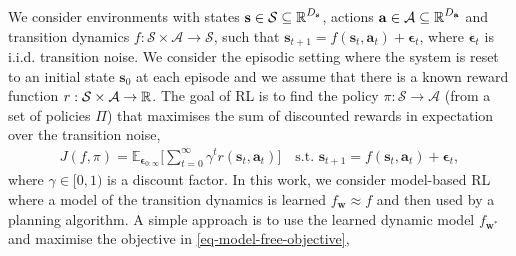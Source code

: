 \documentclass{article}
\newcommand{\state}{\ensuremath{\mathbf{s}}}
\newcommand{\action}{\ensuremath{\mathbf{a}}}
\newcommand{\noise}{\ensuremath{\bm\epsilon}}
\newcommand{\discount}{\ensuremath{\gamma}}
\newcommand{\stateDomain}{\ensuremath{\mathcal{S}}}
\newcommand{\actionDomain}{\ensuremath{\mathcal{A}}}
\newcommand{\policyDomain}{\ensuremath{\Pi}}
\newcommand{\rewardFn}{\ensuremath{r}}
\newcommand{\transitionFn}{\ensuremath{f}}
\newcommand{\policy}{\ensuremath{\pi}}
\begin{document}
We consider environments with states \(\state \in \stateDomain \subseteq \R^{D_{\state}} \),
actions \(\action \in \actionDomain \subseteq \R^{D_{\action}}\) and transition dynamics
\(\transitionFn: \stateDomain \times \actionDomain \rightarrow \stateDomain \), such that
$\state_{t+1} = \transitionFn(\state_{t}, \action_{t}) + \noise_{t}$, where  $\noise_{t}$
is i.i.d. transition noise.
We consider the episodic setting where the system is reset to an initial state $\state_{0}$ at each episode and we
assume that there is a known reward function $r : \stateDomain \times \actionDomain \rightarrow \R$.
The goal of RL is to find the policy \(\pi : \stateDomain \rightarrow \actionDomain\)
(from a set of policies $\Pi$) that maximises the sum of discounted rewards
in expectation over the transition noise,
\begin{align} \label{eq-model-free-objective}
J(\transitionFn, \policy) = \mathbb{E}_{\noise_{0:\infty}} \bigg[ \sum_{t=0}^{\infty} \discount^{t} \rewardFn(\state_{t},\action_{t}) \bigg]
\quad \text{s.t. } \state_{t+1} = \transitionFn(\state_{t}, \action_{t}) + \noise_{t},
\end{align}
where $\gamma \in [0, 1)$ is a discount factor.
In this work, we consider model-based RL where a model of the transition dynamics is learned \(f_{\mathbf{w}} \approx \transitionFn\) and then used by a planning algorithm.
A simple approach is to use the learned dynamic model $f_{\mathbf{w}^{*}}$ and maximise the objective in \cref{eq-model-free-objective},
\end{document}
